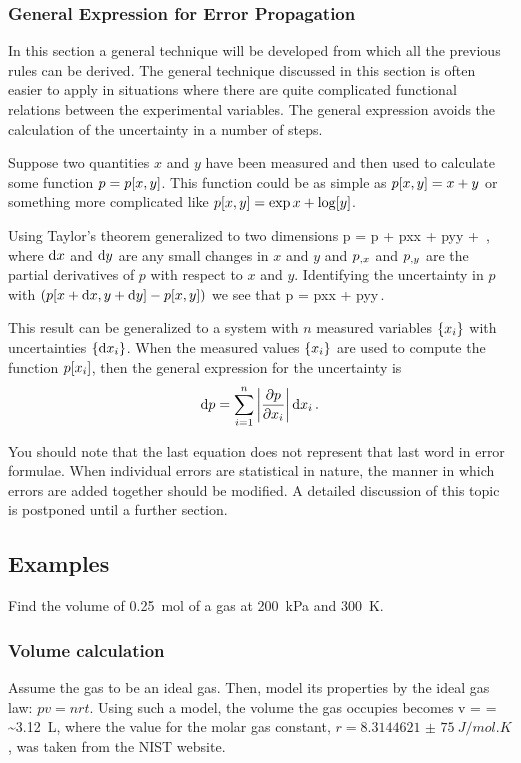 \subsubsection{General Expression for Error Propagation}
In this section a general technique will be developed from which all the previous rules can be derived. The general technique discussed in this section is often easier to apply in situations where there are quite complicated functional relations between the experimental variables. The general expression avoids the calculation of the uncertainty in a number of steps.

Suppose two quantities $x$ and $y$ have been measured and then used to calculate some function $p = p\!\left[{x,y}\right]$. This function could be as simple as $p\!\left[{x,y}\right] = x + y$ or something more complicated like $p\!\left[{x,y}\right] = \exp{x} + \log\!\left[{y}\right]$.

Using Taylor's theorem generalized to two dimensions
\beq
p = p + \xpd px\dx x + \xpd py\dx y + \dotsb\,,
\eeq
where $\text{d} x$ and $\text{d} y$ are any small changes in $x$ and $y$ and ${p}_{,{x}}$ and ${p}_{,{y}}$ are the partial derivatives of $p$ with respect to $x$ and $y$. Identifying the uncertainty in $p$ with $(p\!\left[{x + \text{d} x, y + \text{d} y}\right] - p\!\left[{x, y}\right])$ we see that
\beq
\dx p = \bigg\vert\xpd px\bigg\vert\dx x + \bigg\vert\xpd py\bigg\vert\dx y\,.
\eeq

This result can be generalized to a system with $n$ measured variables $\left\lbrace{x_i}\right\rbrace$ with uncertainties $\left\lbrace{\text{d}x_i}\right\rbrace$. When the measured values $\left\lbrace{x_i}\right\rbrace$ are used to compute the function $p\!\left[{x_i}\right]$, then the general expression for the uncertainty is
\begin{equation}\label{eq:erroranalysisformula}
\text{d} p = \sum_{i = 1}^n\bigg\vert\dfrac{\partial{p}}{\partial{x_i}}\bigg\vert\,\text{d} x_i\,.
\end{equation}

You should note that the last equation does not represent that last word in error formulae. When individual errors are statistical in nature, the manner in which errors are added together should be modified. A detailed discussion of this topic is postponed until a further section.


\subsection{Examples}
Find the volume of \SI{0.25}{mol} of a gas at \SI{200}{kPa} and \SI{300}{K}.


\subsubsection{Volume calculation}
Assume the gas to be an ideal gas. Then, model its properties by the ideal gas law: $pv = nrt$. Using such a model, the volume the gas occupies becomes
\beq
v =  =  \sim \SI{3.12}{L},
\eeq
where the value for the molar gas constant, $r = \SI[separate-uncertainty = false]{8.314 4621(75)}{J/mol.K}$, was taken from the NIST website.


